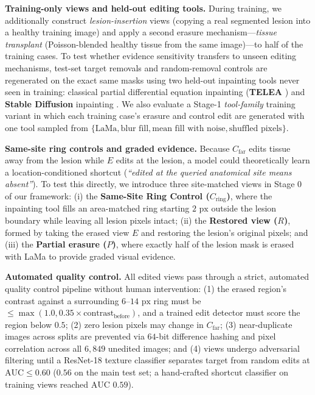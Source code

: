 \documentclass{article} %
\begin{document}
\textbf{Training-only views and held-out editing tools.} During training, we additionally construct \emph{lesion-insertion} views (copying a real segmented lesion into a healthy training image) and apply a second erasure mechanism---\emph{tissue transplant} (Poisson-blended healthy tissue from the same image)---to half of the training cases. To test whether evidence sensitivity transfers to unseen editing mechanisms, test-set target removals and random-removal controls are regenerated on the exact same masks using two held-out inpainting tools never seen in training: classical partial differential equation inpainting (\textbf{TELEA} \citep{telea2004image}) and \textbf{Stable Diffusion} inpainting \citep{rombach2022high}. We also evaluate a Stage-1 \emph{tool-family} training variant in which each training case's erasure and control edit are generated with one tool sampled from $\{\text{LaMa}, \text{blur fill}, \text{mean fill with noise}, \text{shuffled pixels}\}$.

\textbf{Same-site ring controls and graded evidence.} Because $C_{\text{far}}$ edits tissue away from the lesion while $E$ edits at the lesion, a model could theoretically learn a location-conditioned shortcut (\emph{``edited at the queried anatomical site means absent''}). To test this directly, we introduce three site-matched views in Stage 0 of our framework: (i) the \textbf{Same-Site Ring Control ($C_{\text{ring}}$)}, where the inpainting tool fills an area-matched ring starting $2\text{ px}$ outside the lesion boundary while leaving all lesion pixels intact; (ii) the \textbf{Restored view ($R$)}, formed by taking the erased view $E$ and restoring the lesion's original pixels; and (iii) the \textbf{Partial erasure ($P$)}, where exactly half of the lesion mask is erased with LaMa to provide graded visual evidence.

\textbf{Automated quality control.} All edited views pass through a strict, automated quality control pipeline without human intervention: (1) the erased region's contrast against a surrounding $6\text{--}14\text{ px}$ ring must be $\le \max(1.0, 0.35 \times \text{contrast}_{\text{before}})$, and a trained edit detector must score the region below $0.5$; (2) zero lesion pixels may change in $C_{\text{far}}$; (3) near-duplicate images across splits are prevented via $64$-bit difference hashing and pixel correlation across all $6,849$ unedited images; and (4) views undergo adversarial filtering until a ResNet-18 texture classifier separates target from random edits at $\text{AUC} \le 0.60$ ($0.56$ on the main test set; a hand-crafted shortcut classifier on training views reached $\text{AUC } 0.59$).
\end{document}
